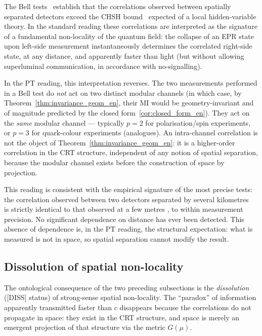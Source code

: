 The Bell tests~\cite{Bell1964,Aspect1982,Hensen2015} establish
that the correlations observed between spatially separated
detectors exceed the CHSH bound~\cite{CHSH1969} expected of a
local hidden-variable theory. In the standard reading these
correlations are interpreted as the signature of a fundamental
non-locality of the quantum field: the collapse of an EPR state
upon left-side measurement instantaneously determines the
correlated right-side state, at any distance, and apparently
faster than light (but without allowing superluminal
communication, in accordance with no-signalling).

In the PT reading, this interpretation reverses. The two
measurements performed in a Bell test do \emph{not} act on two
distinct modular channels (in which case, by
Theorem~\ref{thm:invariance_geom_en}, their MI would be
geometry-invariant and of magnitude predicted by the closed
form~\eqref{cor:closed_form_en}). They act on the \emph{same}
modular channel --- typically $p = 2$ for polarisation/spin
experiments, or $p = 3$ for quark-colour experiments
(analogues). An intra-channel correlation is not the object of
Theorem~\ref{thm:invariance_geom_en}: it is a higher-order
correlation in the CRT structure, independent of any notion of
spatial separation, because the modular channel exists before
the construction of space by projection.

This reading is consistent with the empirical signature of the
most precise tests: the correlation observed between two
detectors separated by several kilometres~\cite{Hensen2015} is
strictly identical to that observed at a few metres
\cite{Aspect1982}, to within measurement precision. No significant
dependence on distance has ever been detected. This absence of
dependence is, in the PT reading, the structural expectation:
what is measured is not in space, so spatial separation cannot
modify the result.

\subsection{Dissolution of spatial non-locality}
\label{ssec:dissolution_consequence_en}

The ontological consequence of the two preceding subsections is
the \emph{dissolution} ([DISS] status) of strong-sense spatial
non-locality. The ``paradox'' of information apparently
transmitted faster than $c$ disappears because the correlations
do not propagate in space: they exist in the CRT structure, and
space is merely an emergent projection of that structure via the
metric $G(\mu)$.

